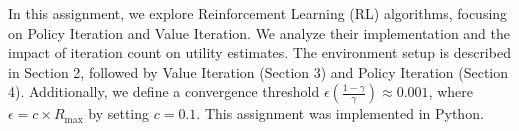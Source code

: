 In this assignment, we explore Reinforcement Learning (RL) algorithms, focusing on Policy Iteration and Value Iteration. We analyze their implementation and the impact of iteration count on utility estimates. The environment setup is described in Section 2, followed by Value Iteration (Section 3) and Policy Iteration (Section 4). Additionally, we define a convergence threshold $\epsilon \left( \frac{1 - \gamma}{\gamma} \right) \approx 0.001$, where $\epsilon = c \times R_{\max}$ by setting $c = 0.1$. This assignment was implemented in Python.
